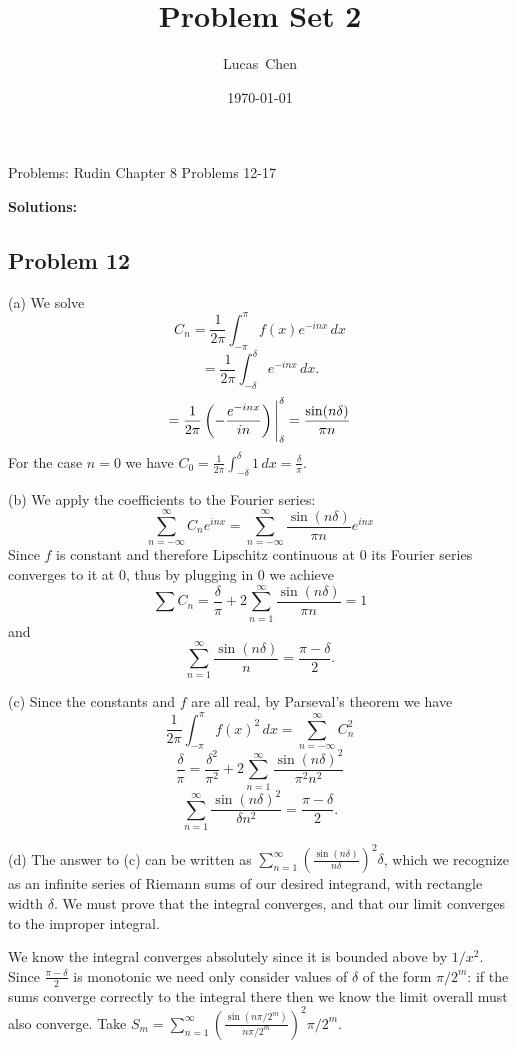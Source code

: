 \documentclass{amsart}
\title{Problem Set 2}
\author{Lucas\ Chen}
\date{\today}
\begin{document}
\maketitle

Problems: Rudin Chapter 8 Problems 12-17

\medskip \noindent \textbf{Solutions:}

\subsection*{Problem 12}
(a) We solve \[C_n = \frac{1}{2\pi}\int_{-\pi}^{\pi} f(x) e^{-inx}\,dx\]
\[=\frac{1}{2\pi}\int_{-\delta}^{\delta} e^{-inx}\,dx.\]
\[=\frac{1}{2\pi}\left(-\frac{e^{-inx}}{in}\right)\Bigg{|}_\delta^\delta = \frac{\sin(n\delta)}{\pi n}\]
For the case $n = 0$ we have $C_0 = \frac{1}{2\pi}\int_{-\delta}^{\delta} 1\,dx = \frac{\delta}{\pi}$.

\medskip \noindent (b) We apply the coefficients to the Fourier series: \[\sum_{n=-\infty}^{\infty}C_n e^{inx} = \sum_{n=-\infty}^{\infty}\frac{\sin(n\delta)}{\pi n} e^{inx}  \]
Since $f$ is constant and therefore Lipschitz continuous at $0$ its Fourier series converges to it at $0$, thus by plugging in $0$ we achieve \[\sum C_n = \frac{\delta}{\pi}+2\sum_{n=1}^{\infty}\frac{\sin(n\delta)}{\pi n} = 1\] and \[\sum_{n=1}^{\infty}\frac{\sin(n\delta)}{n}=\frac{\pi-\delta}{2}.\]

\medskip \noindent (c) Since the constants and $f$ are all real, by Parseval's theorem we have
\[\frac{1}{2\pi}\int_{-\pi}^\pi f(x)^2\,dx = \sum_{n = -\infty}^\infty C_n^2\]
\[\frac{\delta}{\pi}=\frac{\delta^2}{\pi^2}+2\sum_{n=1}^\infty\frac{\sin(n\delta)^2}{\pi^2n^2}\]
\[\sum_{n=1}^\infty\frac{\sin(n\delta)^2}{\delta n^2} = \frac{\pi-\delta}{2}.\]

\medskip \noindent (d) The answer to (c) can be written as $\sum_{n=1}^\infty \left(\frac{\sin(n\delta)}{n\delta}\right)^2\delta$, which we recognize as an infinite series of Riemann sums of our desired integrand, with rectangle width $\delta$. We must prove that the integral converges, and that our limit converges to the improper integral.

\medskip \noindent We know the integral converges absolutely since it is bounded above by $1/x^2$. Since $\frac{\pi-\delta}{2}$ is monotonic we need only consider values of $\delta$ of the form $\pi/2^m$: if the sums converge correctly to the integral there then we know the limit overall must also converge. Take $S_m =\sum_{n=1}^\infty\left(\frac{\sin(n\pi/2^m)}{n\pi/2^m}\right)^2\pi/2^m$.
\end{document}
